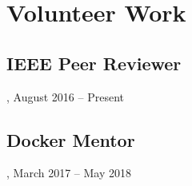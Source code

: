 \section{Volunteer Work}
\subsection{IEEE Peer Reviewer}, August 2016 -- Present
\subsection{Docker Mentor}, March 2017 -- May 2018
